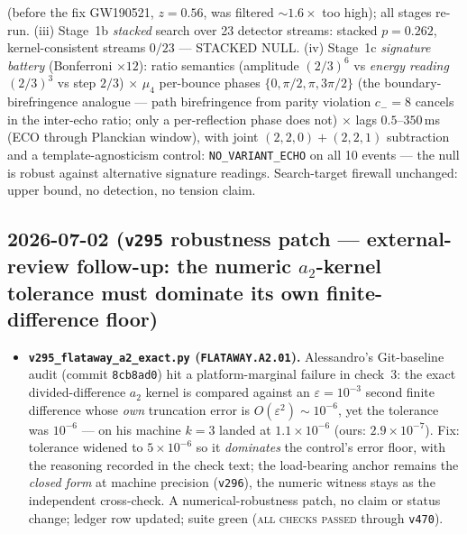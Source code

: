 \documentclass[11pt]{article}
\begin{document}
\begin{itemize}[leftmargin=1.5em]
(before the fix GW190521, $z{=}0.56$, was filtered ${\sim}1.6\times$ too high); all stages re-run.
(iii) Stage~1b \emph{stacked} search over 23 detector streams: stacked $p{=}0.262$, kernel-consistent
streams $0/23$ --- STACKED NULL. (iv) Stage~1c \emph{signature battery} (Bonferroni $\times12$): ratio
semantics (amplitude $(2/3)^6$ vs \emph{energy reading} $(2/3)^3$ vs step $2/3$) $\times$ $\mu_4$
per-bounce phases $\{0,\pi/2,\pi,3\pi/2\}$ (the boundary-birefringence analogue --- path birefringence
from parity violation $c_-{=}8$ cancels in the inter-echo ratio; only a per-reflection phase does not)
$\times$ lags $0.5$--$350$\,ms (ECO through Planckian window), with joint $(2,2,0){+}(2,2,1)$ subtraction
and a template-agnosticism control: \texttt{NO\_VARIANT\_ECHO} on all 10 events --- the null is robust
against alternative signature readings. Search-target firewall unchanged: upper bound, no detection, no
tension claim.
\end{itemize}

\subsection*{2026-07-02 (\texttt{v295} robustness patch --- external-review follow-up: the numeric $a_2$-kernel tolerance must dominate its own finite-difference floor)}
\begin{itemize}
\item \textbf{\texttt{v295\_flataway\_a2\_exact.py} (\texttt{FLATAWAY.A2.01}).} Alessandro's Git-baseline audit
(commit \texttt{8cb8ad0}) hit a platform-marginal failure in check~3: the exact divided-difference $a_2$ kernel
is compared against an $\varepsilon{=}10^{-3}$ second finite difference whose \emph{own} truncation error is
$O(\varepsilon^2)\sim10^{-6}$, yet the tolerance was $10^{-6}$ --- on his machine $k{=}3$ landed at
$1.1\times10^{-6}$ (ours: $2.9\times10^{-7}$). Fix: tolerance widened to $5\times10^{-6}$ so it \emph{dominates}
the control's error floor, with the reasoning recorded in the check text; the load-bearing anchor remains the
\emph{closed form} at machine precision (\texttt{v296}), the numeric witness stays as the independent
cross-check. A numerical-robustness patch, no claim or status change; ledger row updated; suite green
(\textsc{all checks passed} through \texttt{v470}).
\end{itemize}
\end{document}
